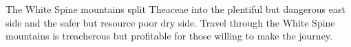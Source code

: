The White Spine mountains split Theaceae into the plentiful but dangerous east side and the safer but resource poor dry side.
Travel through the White Spine mountains is treacherous but profitable for those willing to make the journey.
